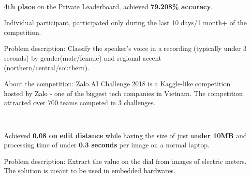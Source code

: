 \\
\begin{xitemize}
    \item \textbf{4th place} on the Private Leaderboard, achieved \textbf{79.208\% accuracy}.
    \item Individual participant, participated only during the last 10 days/1 month+ of
    the competition.
    \item Problem description: Classify the speaker's voice in a recording (typically
    under 3 seconds) by gender(male/female) and regional accent (northern/central/southern).
    \item About the competition: Zalo AI Challenge 2018 is a Kaggle-like competition hosted
    by Zalo - one of the biggest tech companies in Vietnam. The competition attracted
    over 700 teams competed in 3 challenges.
\end{xitemize}

\\
\begin{xitemize}
    \item Achieved \textbf{0.08 on edit distance} while having the size of just
    \textbf{under 10MB} and processing time of under \textbf{0.3 seconds} per image on a
    normal laptop.
    \item Problem description: Extract the value on the dial from images of electric
    meters. The solution is meant to be used in embedded hardwares.
\end{xitemize}



